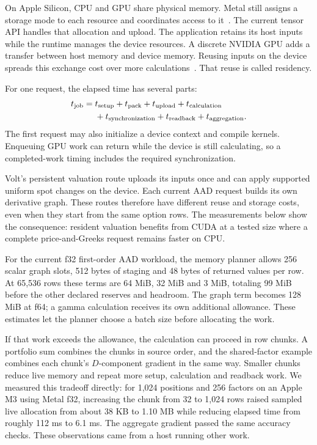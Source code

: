 \documentclass[8pt]{strategynet-journal}
\begin{document}
\begin{SNcolumns}
On Apple Silicon, CPU and GPU share physical memory. Metal still assigns a
storage mode to each resource and coordinates access to it~\cite{apple}.
The current tensor API handles that allocation and upload. The application
retains its host inputs while the runtime manages the device resources. A discrete NVIDIA
GPU adds a transfer between host memory and device memory. Reusing inputs on
the device spreads this exchange cost over more calculations~\cite{nvidia}.
That reuse is called residency.

For one request, the elapsed time has several parts:
\begin{align*}
 t_{\rm job}={}&t_{\rm setup}+t_{\rm pack}+t_{\rm upload}
 +t_{\rm calculation}\\
 &+t_{\rm synchronization}+t_{\rm readback}+t_{\rm aggregation}.
\end{align*}
The first request may also initialize a device context and compile kernels.
Enqueuing GPU work can return while the device is still calculating, so a
completed-work timing includes the required synchronization.

Volt's persistent valuation route uploads its inputs once and can apply
supported uniform spot changes on the device. Each current AAD request builds
its own derivative graph. These routes therefore have different reuse and
storage costs, even when they start from the same option rows. The measurements
below show the consequence: resident valuation benefits from CUDA at a tested
size where a complete price-and-Greeks request remains faster on CPU.

For the current f32 first-order AAD workload, the memory planner allows 256 scalar graph slots, 512 bytes
of staging and 48 bytes of returned values per row. At 65,536 rows these terms
are 64 MiB, 32 MiB and 3 MiB, totaling 99 MiB before the other declared reserves
and headroom. The graph term becomes 128 MiB at f64; a gamma calculation receives
its own additional allowance. These estimates let the planner choose a batch
size before allocating the work.

If that work exceeds the allowance, the calculation can proceed in row chunks.
A portfolio sum combines the chunks in source order, and the shared-factor
example combines each chunk's $D$-component gradient in the same way. Smaller
chunks reduce live memory and repeat more setup, calculation and readback work.
We measured this tradeoff directly: for 1,024 positions and 256 factors on
an Apple M3 using Metal f32, increasing the chunk from 32 to 1,024 rows raised sampled live
allocation from about 38 KB to 1.10 MB while reducing elapsed time from roughly
112 ms to 6.1 ms. The aggregate gradient passed the same accuracy checks.
These observations came from a host running other work.


\end{SNcolumns}
\end{document}
